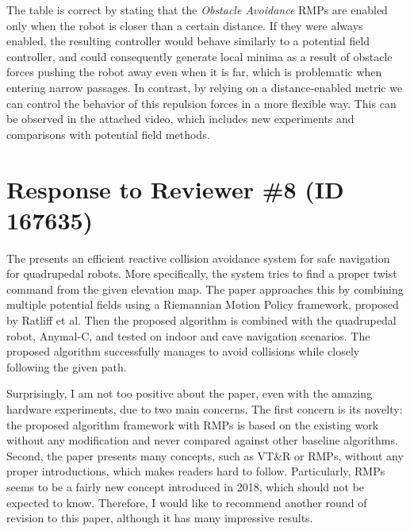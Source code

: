 \documentclass[a4paper,11pt]{article}
\begin{document}
\begin{outline}[enumerate]
	\1 The table is correct by stating that the \emph{Obstacle Avoidance} RMPs 
	are enabled only when the robot is closer than a certain distance.
	\1 If they were always enabled, the resulting controller would behave 
	similarly to a potential field controller, and could consequently generate 
	local minima as a result of obstacle forces pushing the robot away even 
	when it is far, which is problematic when entering narrow passages.
	\1 In contrast, by relying on a distance-enabled metric we can control the 
	behavior of this repulsion forces in a more flexible way.
	\1 This can be observed in the attached video, which includes new 
	experiments and comparisons with potential field methods.
\end{outline}


\pagebreak
\section*{Response to Reviewer \#8 (ID 167635)}

\begin{displayquote}
	The presents an efficient reactive collision avoidance system for safe
	navigation for quadrupedal robots. More specifically, the system tries
	to find a proper twist command from the given elevation map. The paper
	approaches this by combining multiple potential fields using a
	Riemannian Motion Policy framework, proposed by Ratliff et al. Then the
	proposed algorithm is combined with the quadrupedal robot, Anymal-C,
	and tested on indoor and cave navigation scenarios. The proposed
	algorithm successfully manages to avoid collisions while closely
	following the given path.

	Surprisingly, I am not too positive about the paper, even with the
	amazing hardware experiments, due to two main concerns. The first
	concern is its novelty: the proposed algorithm framework with RMPs is
	based on the existing work without any modification and never compared
	against other baseline algorithms. Second, the paper presents many
	concepts, such as VT\&R or RMPs, without any proper introductions, which
	makes readers hard to follow. Particularly, RMPs seems to be a fairly
	new concept introduced in 2018, which should not be expected to know.
	Therefore, I would like to recommend another round of revision to this
	paper, although it has many impressive results.
\end{displayquote}
\end{document}
